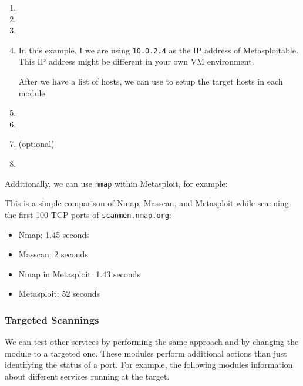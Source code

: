 \begin{enumerate}
    \item {}
    \item {}
    \item {}
    \item {}
    \begin{warnbox}[frametitle=Warning: Metasploitable IP Addess,outermargin=-25pt]
        In this example, I we are using \texttt{10.0.2.4} as the IP address of Metasploitable. This IP address might be different in your own VM environment.
    \end{warnbox}
    \begin{tipbox}[outermargin=-25pt]
        After we have a list of hosts, we can use  to setup the target hosts in each module
    \end{tipbox}
    \item {}
    \item {}
    \item (optional) 
    \item {}
\end{enumerate}

Additionally, we can use \texttt{nmap} within Metasploit, for example:


\begin{infobox}[frametitle=Info: Speed Comparison]
    This is a simple comparison of Nmap, Masscan, and Metasploit while scanning the first 100 TCP ports of \texttt{scanmen.nmap.org}:
    \begin{itemize}
        \item Nmap: 1.45 seconds
        \item Masscan: 2 seconds
        \item Nmap in Metasploit: 1.43 seconds
        \item Metasploit: 52 seconds
    \end{itemize}
\end{infobox}


\subsubsection{Targeted Scannings}
We can test other services by performing the same approach and by changing the module to a targeted one. These modules perform additional actions than just identifying the status of a port. For example, the following modules information about different services running at the target.

